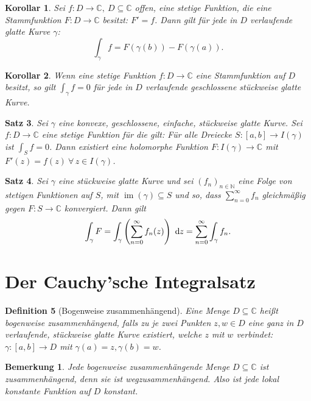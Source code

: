 \documentclass[a4paper,12pt]{book}
\theoremstyle{newthm}
\newtheorem{thm}{Satz}[section]
\newtheorem{cor}[thm]{Korollar}
\theoremstyle{newdef}
\newtheorem{defn}[thm]{Definition}
\theoremstyle{newrem}
\newtheorem*{rem}{Bemerkung}
\newcommand{\N}{\mathbb{N}}
\newcommand{\C}{\mathbb{C}}
\renewcommand{\d}{\ \operatorname{d}\hspace{-2px}}
\DeclareMathOperator{\im}{im}
\begin{document}
		\begin{cor}
			Sei $ f: D \to \C,\ D \subseteq \C $ offen, eine stetige Funktion, die eine Stammfunktion $ F: D \to \C $ besitzt: $ F' = f $. Dann gilt für jede in $D$ verlaufende glatte Kurve $\gamma$:
			\[ \int_\gamma f = F(\gamma(b)) - F(\gamma(a)). \]
		\end{cor}
		
		\begin{cor}
			Wenn eine stetige Funktion $ f: D \to \C $ eine Stammfunktion auf $D$ besitzt, so gilt $ \int_\gamma f = 0 $ für \emph{jede} in $D$ verlaufende geschlossene stückweise glatte Kurve.
		\end{cor}
		
		\begin{thm}
			Sei $\gamma$ eine konvexe, geschlossene, einfache, stückweise glatte Kurve. Sei $ f: D \to \C $ eine stetige Funktion für die gilt: Für alle Dreiecke $ S: [a,b] \to I(\gamma) $ ist $ \int_S f=0 $. Dann existiert eine holomorphe Funktion $ F: I(\gamma) \to \C $ mit $ F'(z) = f(z) \ \forall\, z \in I(\gamma) $.
		\end{thm}
		
		\begin{thm}
			Sei $\gamma$ eine stückweise glatte Kurve und sei $ (f_n)_{n \in \N} $ eine Folge von stetigen Funktionen auf $S$, mit $ \im(\gamma) \subseteq S $ und so, dass $ \sum\limits_{n=0}^\infty f_n $ gleichmäßig gegen $ F:S \to \C $ konvergiert. Dann gilt
			\[ \int_\gamma F = \int_\gamma \left( \sum_{n=0}^\infty f_n(z) \right) \d z = \sum_{n=0}^\infty \int_\gamma f_n. \]
		\end{thm}
	
	
	
	\section{Der Cauchy'sche Integralsatz}
		
		\begin{defn}[Bogenweise zusammenhängend]
			Eine Menge $ D \subseteq \C $ heißt \emph{bogenweise zusammenhängend}, falls zu je zwei Punkten $ z,w \in D $ eine ganz in $D$ verlaufende, stückweise glatte Kurve existiert, welche $z$ mit $w$ verbindet: $ \gamma: [a,b] \to D $ mit $ \gamma(a) = z, \gamma(b)=w $.
		\end{defn}
		
		\begin{rem}
			Jede bogenweise zusammenhängende Menge $ D \subseteq \C $ ist zusammenhängend, denn sie ist wegzusammenhängend. Also ist jede lokal konstante Funktion auf $D$ konstant.
		\end{rem}
		
\end{document}
